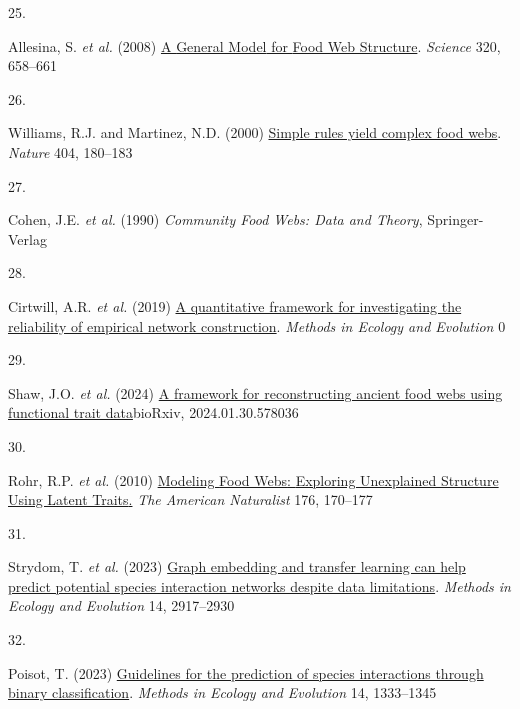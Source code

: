 \documentclass[
]{article}
\newlength{\cslhangindent}
\newlength{\csllabelwidth}
\newenvironment{CSLReferences}[2] %
 {\begin{list}{}{%
  \setlength{\itemindent}{0pt}
  \setlength{\leftmargin}{0pt}
  \setlength{\parsep}{0pt}
  \ifodd #1
   \setlength{\leftmargin}{\cslhangindent}
   \setlength{\itemindent}{-1\cslhangindent}
  \fi
  \setlength{\itemsep}{#2\baselineskip}}}
 {\end{list}}
\newcommand{\CSLLeftMargin}[1]{\parbox[t]{\csllabelwidth}{\strut#1\strut}}
\newcommand{\CSLRightInline}[1]{\parbox[t]{\linewidth - \csllabelwidth}{\strut#1\strut}}
\begin{document}
\begin{CSLReferences}{0}{0}
\CSLLeftMargin{25. }%
\CSLRightInline{Allesina, S. \emph{et al.} (2008)
\href{https://doi.org/10.1126/science.1156269}{A {General Model} for
{Food Web Structure}}. \emph{Science} 320, 658--661}

\CSLLeftMargin{26. }%
\CSLRightInline{Williams, R.J. and Martinez, N.D. (2000)
\href{https://doi.org/10.1038/35004572}{Simple rules yield complex food
webs}. \emph{Nature} 404, 180--183}

\CSLLeftMargin{27. }%
\CSLRightInline{Cohen, J.E. \emph{et al.} (1990) \emph{Community {Food
Webs}: {Data} and {Theory}}, Springer-Verlag}

\CSLLeftMargin{28. }%
\CSLRightInline{Cirtwill, A.R. \emph{et al.} (2019)
\href{https://doi.org/10.1111/2041-210X.13180}{A quantitative framework
for investigating the reliability of empirical network construction}.
\emph{Methods in Ecology and Evolution} 0}

\CSLLeftMargin{29. }%
\CSLRightInline{Shaw, J.O. \emph{et al.} (2024)
\href{https://doi.org/10.1101/2024.01.30.578036}{A framework for
reconstructing ancient food webs using functional trait data}bioRxiv,
2024.01.30.578036}

\CSLLeftMargin{30. }%
\CSLRightInline{Rohr, R.P. \emph{et al.} (2010)
\href{https://doi.org/10.1086/653667}{Modeling {Food Webs}: {Exploring
Unexplained Structure Using Latent Traits}.} \emph{The American
Naturalist} 176, 170--177}

\CSLLeftMargin{31. }%
\CSLRightInline{Strydom, T. \emph{et al.} (2023)
\href{https://doi.org/10.1111/2041-210X.14228}{Graph embedding and
transfer learning can help predict potential species interaction
networks despite data limitations}. \emph{Methods in Ecology and
Evolution} 14, 2917--2930}

\CSLLeftMargin{32. }%
\CSLRightInline{Poisot, T. (2023)
\href{https://doi.org/10.1111/2041-210X.14071}{Guidelines for the
prediction of species interactions through binary classification}.
\emph{Methods in Ecology and Evolution} 14, 1333--1345}


\end{CSLReferences}
\end{document}
